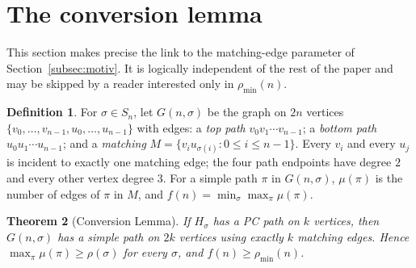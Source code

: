 \documentclass[11pt]{article}
\newtheorem{theorem}{Theorem}[section]
\theoremstyle{definition}
\newtheorem{definition}[theorem]{Definition}
\newcommand{\pmin}{\rho_{\min}}
\begin{document}
\section{The conversion lemma}\label{sec:conversion}

This section makes precise the link to the matching-edge parameter of
Section~\ref{subsec:motiv}. It is logically independent of the rest of the paper and
may be skipped by a reader interested only in $\pmin(n)$.

\begin{definition}\label{def:Gns}
For $\sigma \in S_n$, let $G(n,\sigma)$ be the graph on $2n$ vertices
$\{v_0,\dots,v_{n-1},u_0,\dots,u_{n-1}\}$ with edges:
a \emph{top path} $v_0 v_1 \cdots v_{n-1}$; a \emph{bottom path}
$u_0 u_1 \cdots u_{n-1}$; and a \emph{matching} $M = \{v_i u_{\sigma(i)} : 0\le i\le
n-1\}$. Every $v_i$ and every $u_j$ is incident to exactly one matching edge; the four
path endpoints have degree $2$ and every other vertex degree $3$. For a simple path
$\pi$ in $G(n,\sigma)$, $\mu(\pi)$ is the number of edges of $\pi$ in $M$, and
$f(n) = \min_\sigma \max_\pi \mu(\pi)$.
\end{definition}

\begin{theorem}[Conversion Lemma]\label{thm:conversion}
If $H_\sigma$ has a PC path on $k$ vertices, then $G(n,\sigma)$ has a simple path on
$2k$ vertices using exactly $k$ matching edges. Hence $\max_\pi \mu(\pi) \ge
\rho(\sigma)$ for every $\sigma$, and $f(n) \ge \pmin(n)$.
\end{theorem}
\end{document}
